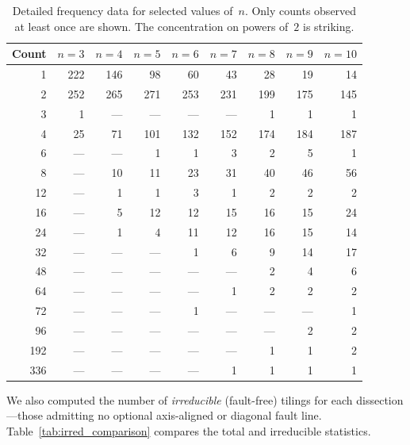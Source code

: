\documentclass[12pt]{article}
\theoremstyle{definition}
\theoremstyle{remark}
\begin{document}
\begin{table}[ht]
\centering
\caption{Detailed frequency data for selected values of~$n$. Only
  counts observed at least once are shown. The concentration on
  powers of~$2$ is striking.}
\label{tab:detailed}
\medskip
\begin{tabular}{@{}r r r r r r r r r@{}}
\toprule
\multicolumn{1}{c}{Count} &
\multicolumn{1}{c}{$n\!=\!3$} &
\multicolumn{1}{c}{$n\!=\!4$} &
\multicolumn{1}{c}{$n\!=\!5$} &
\multicolumn{1}{c}{$n\!=\!6$} &
\multicolumn{1}{c}{$n\!=\!7$} &
\multicolumn{1}{c}{$n\!=\!8$} &
\multicolumn{1}{c}{$n\!=\!9$} &
\multicolumn{1}{c}{$n\!=\!10$} \\
\midrule
   1 & 222 & 146 &  98 &  60 &  43 &  28 &  19 &  14 \\
   2 & 252 & 265 & 271 & 253 & 231 & 199 & 175 & 145 \\
   3 &   1 &  ---  &  ---  &  ---  &  ---  &   1 &   1 &   1 \\
   4 &  25 &  71 & 101 & 132 & 152 & 174 & 184 & 187 \\
   6 &  ---  &  ---  &   1 &   1 &   3 &   2 &   5 &   1 \\
   8 &  ---  &  10 &  11 &  23 &  31 &  40 &  46 &  56 \\
  12 &  ---  &   1 &   1 &   3 &   1 &   2 &   2 &   2 \\
  16 &  ---  &   5 &  12 &  12 &  15 &  16 &  15 &  24 \\
  24 &  ---  &   1 &   4 &  11 &  12 &  16 &  15 &  14 \\
  32 &  ---  &  ---  &  ---  &   1 &   6 &   9 &  14 &  17 \\
  48 &  ---  &  ---  &  ---  &  ---  &  ---  &   2 &   4 &   6 \\
  64 &  ---  &  ---  &  ---  &  ---  &   1 &   2 &   2 &   2 \\
  72 &  ---  &  ---  &  ---  &   1 &  ---  &  ---  &  ---  &   1 \\
  96 &  ---  &  ---  &  ---  &  ---  &  ---  &  ---  &   2 &   2 \\
 192 &  ---  &  ---  &  ---  &  ---  &  ---  &   1 &   1 &   2 \\
 336 &  ---  &  ---  &  ---  &  ---  &   1 &   1 &   1 &   1 \\
\bottomrule
\end{tabular}
\end{table}

We also computed the number of \emph{irreducible} (fault-free) tilings
for each dissection---those admitting no optional axis-aligned or
diagonal fault line. Table~\ref{tab:irred_comparison} compares the
total and irreducible statistics.
\end{document}
